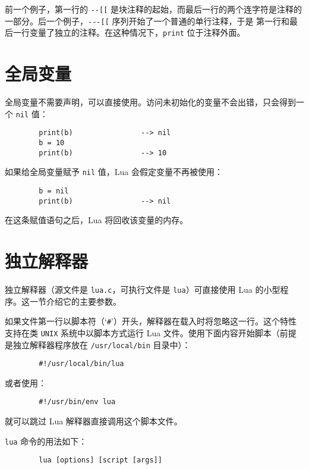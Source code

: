 前一个例子，第一行的 \verb|--[[| 是块注释的起始，而最后一行的两个连字符是注释的一部分。后一个例子，\verb|---[[| 序列开始了一个普通的单行注释，于是 第一行和最后一行变量了独立的注释。在这种情况下，\verb|print| 位于注释外面。

\section{全局变量}

全局变量不需要声明，可以直接使用。访问未初始化的变量不会出错，只会得到一个 \verb|nil| 值：

\begin{verbatim}
        print(b)                --> nil
        b = 10
        print(b)                --> 10
\end{verbatim}

如果给全局变量赋予 \verb|nil| 值，Lua 会假定变量不再被使用：

\begin{verbatim}
        b = nil
        print(b)                --> nil
\end{verbatim}

在这条赋值语句之后，Lua 将回收该变量的内存。

\section{独立解释器}

独立解释器（源文件是 \verb|lua.c|，可执行文件是 \verb|lua|）可直接使用 Lua 的小型程序。这一节介绍它的主要参数。

如果文件第一行以脚本符（`\verb|#|'）开头，解释器在载入时将忽略这一行。这个特性支持在类 \verb|UNIX| 系统中以脚本方式运行 Lua 文件。使用下面内容开始脚本（前提是独立解释器程序放在 \verb|/usr/local/bin| 目录中）：

\begin{verbatim}
        #!/usr/local/bin/lua
\end{verbatim}

或者使用：

\begin{verbatim}
        #!/usr/bin/env lua
\end{verbatim}

就可以跳过 Lua 解释器直接调用这个脚本文件。

\verb|lua| 命令的用法如下：

\begin{verbatim}
        lua [options] [script [args]]
\end{verbatim}

